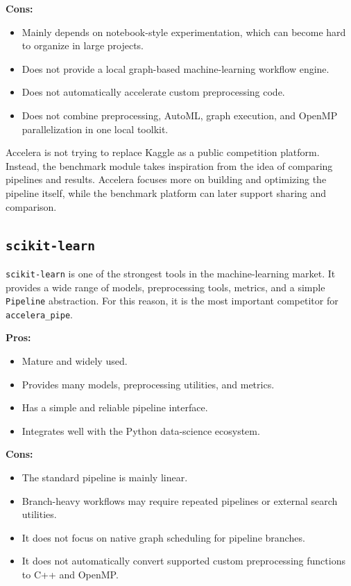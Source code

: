 \documentclass[12pt,a4paper]{report}
\begin{document}
\textbf{Cons:}
\begin{itemize}
  \item Mainly depends on notebook-style experimentation, which can become hard
  to organize in large projects.
  \item Does not provide a local graph-based machine-learning workflow engine.
  \item Does not automatically accelerate custom preprocessing code.
  \item Does not combine preprocessing, AutoML, graph execution, and OpenMP
  parallelization in one local toolkit.
\end{itemize}

Accelera is not trying to replace Kaggle as a public competition platform.
Instead, the benchmark module takes inspiration from the idea of comparing
pipelines and results. Accelera focuses more on building and optimizing the
pipeline itself, while the benchmark platform can later support sharing and
comparison.

\subsection{\texttt{scikit-learn}}

\texttt{scikit-learn} is one of the strongest tools in the machine-learning
market. It provides a wide range of models, preprocessing tools, metrics, and a
simple \texttt{Pipeline} abstraction. For this reason, it is the most important
competitor for \texttt{accelera\_pipe}.

\textbf{Pros:}
\begin{itemize}
  \item Mature and widely used.
  \item Provides many models, preprocessing utilities, and metrics.
  \item Has a simple and reliable pipeline interface.
  \item Integrates well with the Python data-science ecosystem.
\end{itemize}

\textbf{Cons:}
\begin{itemize}
  \item The standard pipeline is mainly linear.
  \item Branch-heavy workflows may require repeated pipelines or external search
  utilities.
  \item It does not focus on native graph scheduling for pipeline branches.
  \item It does not automatically convert supported custom preprocessing
  functions to C++ and OpenMP.
\end{itemize}
\end{document}
